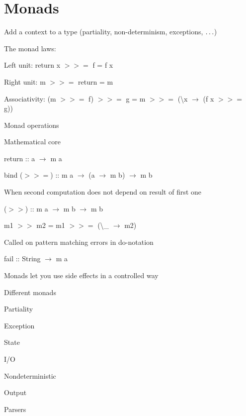 \section{Monads}
\enumstart
	\item Add a context to a type (partiality, non-determinism, exceptions, $\mathellipsis$)
	\item The monad laws:
	\enumstart
		\item Left unit: return x $>>=$ f = f x
		\item Right unit: m $>>=$ return = m
		\item Associativity: (m $>>=$ f) $>>=$ g = m $>>=$ (\textbackslash x $\rightarrow$ (f x $>>=$ g))
	\enumend
	\item Monad operations
	\enumstart
		\item Mathematical core
		\enumstart
			\item return :: a $\rightarrow$ m a
			\item bind ($>>=$) :: m a $\rightarrow$ (a $\rightarrow$ m b) $\rightarrow$ m b
		\enumend
		\item When second computation does not depend on result of first one
		\enumstart
			\item ($>>$) :: m a $\rightarrow$ m b $\rightarrow$ m b
			\item m1 $>>$ m2 = m1 $>>=$ (\textbackslash \_ $\rightarrow$ m2)
		\enumend
		\item Called on pattern matching errors in do-notation
		\enumstart
			\item fail :: String $\rightarrow$ m a
		\enumend
	\enumend
	\item Monads let you use side effects in a controlled way
	\item Different monads
	\enumstart
		\item Partiality
		\item Exception
		\item State
		\item I/O
		\item Nondeterministic
		\item Output
		\item Parsers
	\enumend
\enumend
